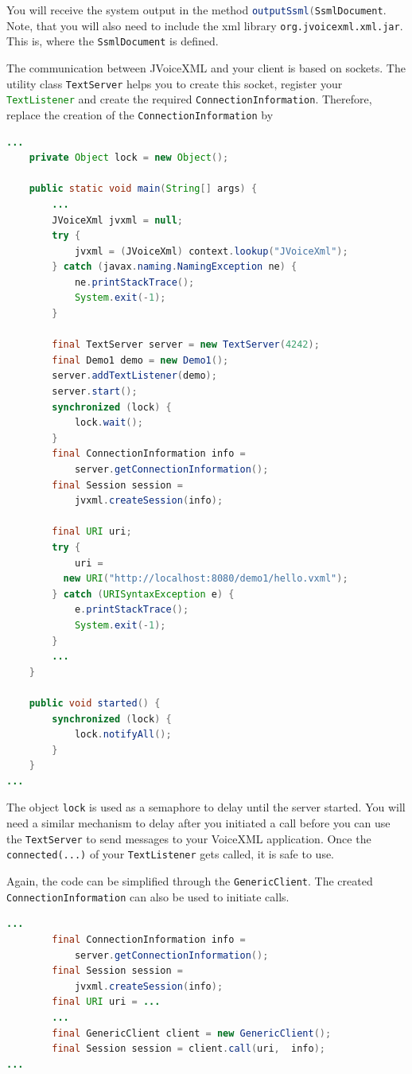 \documentclass[11pt,a4paper]{book}
\begin{document}
You will receive the system output in the method
\lstinline[language=Java]{outputSsml(SsmlDocument}. Note, that you will also
need to include the xml library \texttt{org.jvoicexml.xml.jar}. This is, where
the \lstinline[language=Java]{SsmlDocument} is defined.

The communication between JVoiceXML and your client is based on sockets. The
utility class \lstinline[language=Java]{TextServer} helps you to create this
socket, register your \lstinline[language=Java]{TextListener} and create the
required \lstinline[language=Java]{ConnectionInformation}. Therefore, replace
the creation of the \lstinline[language=Java]{ConnectionInformation} by

\begin{lstlisting}[language=Java]
...
    private Object lock = new Object();

    public static void main(String[] args) {
        ...
        JVoiceXml jvxml = null;
        try {
            jvxml = (JVoiceXml) context.lookup("JVoiceXml");
        } catch (javax.naming.NamingException ne) {
            ne.printStackTrace();
            System.exit(-1);
        }

        final TextServer server = new TextServer(4242);
        final Demo1 demo = new Demo1();
        server.addTextListener(demo);
        server.start();
        synchronized (lock) {
            lock.wait();
        }
        final ConnectionInformation info =
            server.getConnectionInformation();
        final Session session = 
            jvxml.createSession(info);

        final URI uri;
        try {
            uri = 
          new URI("http://localhost:8080/demo1/hello.vxml");
        } catch (URISyntaxException e) {
            e.printStackTrace();
            System.exit(-1);
        }
        ...
    }

    public void started() {
        synchronized (lock) {
            lock.notifyAll();
        }
    }
...
\end{lstlisting}

The object \lstinline[language=Java]{lock} is used as a semaphore to delay until
the server started. You will need a similar mechanism to delay after you
initiated a call before you can use the \lstinline{TextServer} to send messages
to your VoiceXML application. Once the \lstinline{connected(...)} of your
\lstinline{TextListener} gets called, it is safe to use.

Again, the code can be simplified through the \lstinline{GenericClient}.
The created \lstinline{ConnectionInformation} can also be used to initiate
calls.
 \begin{lstlisting}[language=Java]
 ...
        final ConnectionInformation info =
            server.getConnectionInformation();
        final Session session = 
            jvxml.createSession(info);
        final URI uri = ...
        ...
        final GenericClient client = new GenericClient();
        final Session session = client.call(uri,  info);
...
\end{lstlisting}
\end{document}
